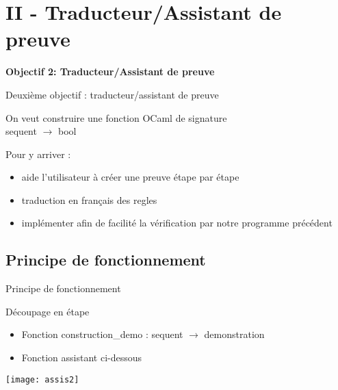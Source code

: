 \documentclass{beamer}
\begin{document}
\section{II - Traducteur/Assistant de preuve}


\begin{frame}
  \centering
  \vfill
  {\LARGE \textbf{Objectif 2: Traducteur/Assistant de preuve}}
  \vfill
\end{frame}



\begin{frame}{Deuxième objectif : traducteur/assistant de preuve}



    On veut construire une fonction OCaml de signature \\sequent {$ \to $} bool

    \vspace{1cm}

    \begin{block}{Pour y arriver : }
    \begin{itemize}
        \item aide l'utilisateur à créer une preuve étape par étape
        \item traduction en français des regles 
        \item implémenter afin de facilité la vérification par notre programme précédent
        \end{itemize}
    
    \end{block}

    


    
\end{frame}

\subsection{Principe de fonctionnement}

\begin{frame}{Principe de fonctionnement}

    \begin{block}{Découpage en étape}
    \begin{itemize}
        \item Fonction construction\_demo : sequent {$\to$} demonstration
        \item Fonction assistant ci-dessous
    \end{itemize}
        
    \end{block}


    \vspace{1.5cm}

    \begin{minipage}{1.05\textwidth}
        \centering
        \texttt{[image: assis2]}
    \end{minipage} 

         

\end{frame}
\end{document}
